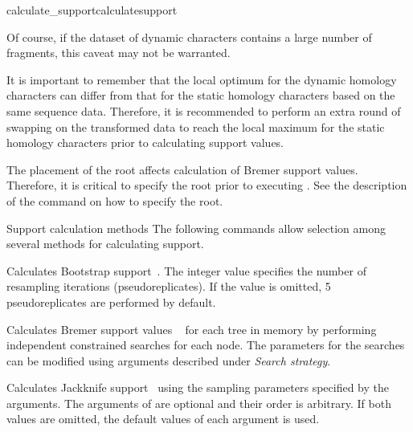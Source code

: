 \begin{command}{calculate\_support}{calculatesupport}
\begin{statement}
        \indent Of course, if the dataset of dynamic characters contains a large
        number of fragments, this caveat may not be warranted.
                
        \indent It is important to remember that the local optimum for the dynamic
        homology characters can differ from that for the static homology characters
        based on the same sequence data. Therefore, it is recommended to perform 
        an extra round of swapping on the transformed data to reach the local 
        maximum for the static homology characters prior to calculating support values.
    \end{statement}
          
    \begin{statement}
        The placement of the root affects calculation of Bremer support values.
        Therefore, it is critical to specify the root prior to executing
        . See the description of the command
         on how to specify the root.
    \end{statement}

    \begin{arguments}
        \begin{argumentgroup}{Support calculation methods}
            {The following commands allow selection among several methods for
            calculating support.} 

                {Calculates Bootstrap support~\cite{Felsenstein1985}.  The integer
                value specifies the number of resampling iterations (pseudoreplicates).
                If the value is omitted, 5 pseudoreplicates are performed by default.} 
                {}
                
                {Calculates Bremer support values ~\cite{Bremer1988, Kallersjoetal1992}
                for each tree in memory by performing independent constrained searches
                for each node. The parameters for the searches can be modified using
                arguments described under \emph{Search strategy}.} 
                {}
  
                {Calculates Jackknife support~\cite{Farrisetal1996} using the 
                sampling parameters specified by the arguments. The arguments of
                 are optional and their order is arbitrary. If
                both values are omitted, the default values of each argument is used.}
                {}
        

\end{argumentgroup}
\end{arguments}
\end{command}

